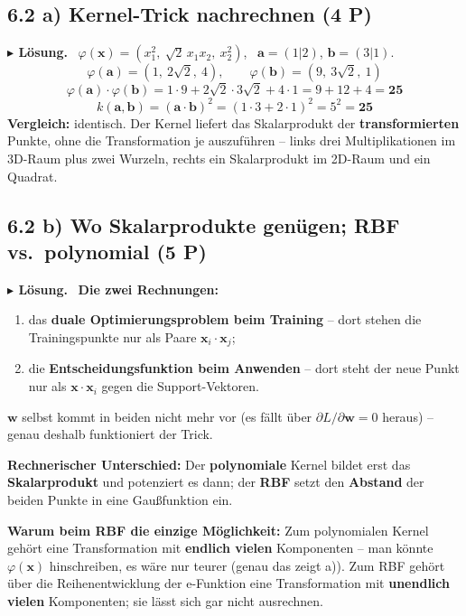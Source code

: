 \documentclass[10pt,a4paper]{article}
\newcommand{\pkt}[1]{\hfill\textbf{(#1 P)}}
\newenvironment{loes}%
  {\par\vspace{2pt}\begingroup\small\noindent\textbf{\color{loesfarbe}$\blacktriangleright$ Lösung.}\ }%
  {\endgroup\par\vspace{5pt}}
\begin{document}
\subsection*{6.2 a) Kernel-Trick nachrechnen \pkt{4}}

\begin{loes}
$\varphi(\boldsymbol{x}) = (x_1^2,\ \sqrt2\,x_1x_2,\ x_2^2)$, \
$\boldsymbol{a} = (1|2)$, $\boldsymbol{b} = (3|1)$.
\[
\varphi(\boldsymbol{a}) = (1,\ 2\sqrt2,\ 4), \qquad
\varphi(\boldsymbol{b}) = (9,\ 3\sqrt2,\ 1)
\]
\[
\varphi(\boldsymbol{a})\cdot\varphi(\boldsymbol{b}) = 1\cdot9 + 2\sqrt2\cdot3\sqrt2 + 4\cdot1
= 9+12+4 = \mathbf{25}
\]
\[
k(\boldsymbol{a},\boldsymbol{b}) = (\boldsymbol{a}\cdot\boldsymbol{b})^2 = (1\cdot3+2\cdot1)^2
= 5^2 = \mathbf{25}
\]
\textbf{Vergleich:} identisch. Der Kernel liefert das Skalarprodukt der \textbf{transformierten}
Punkte, ohne die Transformation je auszuführen -- links drei Multiplikationen im 3D-Raum plus zwei
Wurzeln, rechts ein Skalarprodukt im 2D-Raum und ein Quadrat.
\end{loes}

\subsection*{6.2 b) Wo Skalarprodukte genügen; RBF vs.\ polynomial \pkt{5}}

\begin{loes}
\textbf{Die zwei Rechnungen:}
\begin{enumerate}
\item das \textbf{duale Optimierungsproblem beim Training} -- dort stehen die Trainingspunkte nur
  als Paare $\boldsymbol{x}_i\cdot\boldsymbol{x}_j$;
\item die \textbf{Entscheidungsfunktion beim Anwenden} -- dort steht der neue Punkt nur als
  $\boldsymbol{x}\cdot\boldsymbol{x}_i$ gegen die Support-Vektoren.
\end{enumerate}
$\boldsymbol{w}$ selbst kommt in beiden nicht mehr vor (es fällt über
$\partial L/\partial\boldsymbol{w} = 0$ heraus) -- genau deshalb funktioniert der Trick.

\textbf{Rechnerischer Unterschied:} Der \textbf{polynomiale} Kernel bildet erst das
\textbf{Skalarprodukt} und potenziert es dann; der \textbf{RBF} setzt den \textbf{Abstand} der
beiden Punkte in eine Gaußfunktion ein.

\textbf{Warum beim RBF die einzige Möglichkeit:} Zum polynomialen Kernel gehört eine Transformation
mit \textbf{endlich vielen} Komponenten -- man könnte $\varphi(\boldsymbol{x})$ hinschreiben, es
wäre nur teurer (genau das zeigt a)). Zum RBF gehört über die Reihenentwicklung der e-Funktion eine
Transformation mit \textbf{unendlich vielen} Komponenten; sie lässt sich gar nicht ausrechnen.
\end{loes}
\end{document}
